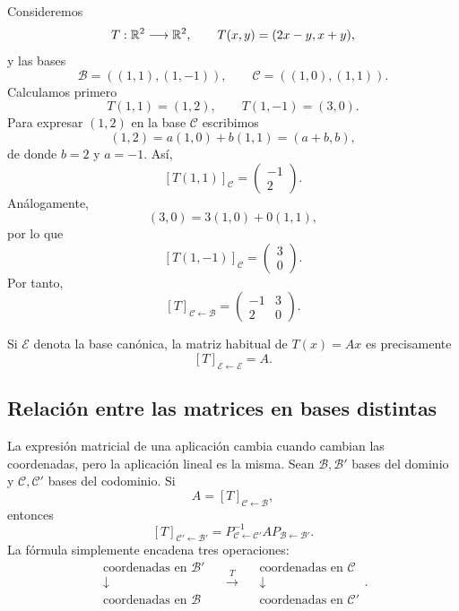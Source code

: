 \begin{example}
Consideremos
\[
T:\mathbb{R}^2\longrightarrow\mathbb{R}^2,
\qquad
T(x,y)=(2x-y,x+y),
\]
y las bases
\[
\mathcal B=((1,1),(1,-1)),
\qquad
\mathcal C=((1,0),(1,1)).
\]
Calculamos primero
\[
T(1,1)=(1,2),
\qquad
T(1,-1)=(3,0).
\]
Para expresar $(1,2)$ en la base $\mathcal C$ escribimos
\[
(1,2)=a(1,0)+b(1,1)=(a+b,b),
\]
de donde $b=2$ y $a=-1$. Así,
\[
[T(1,1)]_{\mathcal C}
=\begin{pmatrix}-1\\2\end{pmatrix}.
\]
Análogamente,
\[
(3,0)=3(1,0)+0(1,1),
\]
por lo que
\[
[T(1,-1)]_{\mathcal C}
=\begin{pmatrix}3\\0\end{pmatrix}.
\]
Por tanto,
\[
\boxed{
[T]_{\mathcal C\leftarrow\mathcal B}
=
\begin{pmatrix}
-1&3\\
2&0
\end{pmatrix}.
}
\]
\end{example}

Si $\mathcal E$ denota la base canónica, la matriz habitual de $T(x)=Ax$ es precisamente
\[
[T]_{\mathcal E\leftarrow\mathcal E}=A.
\]

\subsection{Relación entre las matrices en bases distintas}

La expresión matricial de una aplicación cambia cuando cambian las coordenadas, pero la aplicación lineal es la misma. Sean $\mathcal B,\mathcal B'$ bases del dominio y $\mathcal C,\mathcal C'$ bases del codominio. Si
\[
A=[T]_{\mathcal C\leftarrow\mathcal B},
\]
entonces
\[
\boxed{
[T]_{\mathcal C'\leftarrow\mathcal B'}
=
P_{\mathcal C\leftarrow\mathcal C'}^{-1}
A
P_{\mathcal B\leftarrow\mathcal B'}.
}
\]
La fórmula simplemente encadena tres operaciones:
\[
\begin{array}{c}
\text{coordenadas en }\mathcal B'\\[-1mm]
\downarrow\\[-1mm]
\text{coordenadas en }\mathcal B
\end{array}
\quad\xrightarrow{\ T\ }\quad
\begin{array}{c}
\text{coordenadas en }\mathcal C\\[-1mm]
\downarrow\\[-1mm]
\text{coordenadas en }\mathcal C'
\end{array}.
\]


